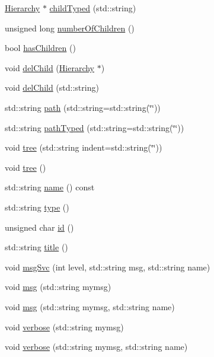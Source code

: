 \begin{DoxyCompactItemize}
\hyperlink{classHierarchy}{Hierarchy} $\ast$ \hyperlink{classHierarchy_a0c15a5276a3b80b4354d6bd8a01e0708}{childTyped} (std::string)
\item 
unsigned long \hyperlink{classHierarchy_ab16e84de65fd84e14001a6cf941c8be4}{numberOfChildren} ()
\item 
bool \hyperlink{classHierarchy_a255174fe4d316d2a3f430dcb9dab29f1}{hasChildren} ()
\item 
void \hyperlink{classHierarchy_a2b2b359fac003233f65786a616766bde}{delChild} (\hyperlink{classHierarchy}{Hierarchy} $\ast$)
\item 
void \hyperlink{classHierarchy_a1928ac7615fe0b5e55cd707f70dc6781}{delChild} (std::string)
\item 
std::string \hyperlink{classHierarchy_aa7990fa7caf132d83e361ce033c6c65a}{path} (std::string=std::string(\char`\"{}\char`\"{}))
\item 
std::string \hyperlink{classHierarchy_a1efd56cd164d328d2002e53a10a19b8c}{pathTyped} (std::string=std::string(\char`\"{}\char`\"{}))
\item 
void \hyperlink{classHierarchy_a76e914b9a677a22a82deb74d892bf261}{tree} (std::string indent=std::string(\char`\"{}\char`\"{}))
\item 
void \hyperlink{classHierarchy_a594c294c5f60c230e106d522ed008212}{tree} ()
\item 
std::string \hyperlink{classObject_a975e888d50bfcbffda2c86368332a5cd}{name} () const 
\item 
std::string \hyperlink{classObject_a84f99f70f144a83e1582d1d0f84e4e62}{type} ()
\item 
unsigned char \hyperlink{classObject_af99145335cc61ff6e2798ea17db009d2}{id} ()
\item 
std::string \hyperlink{classObject_a73a0f1a41828fdd8303dd662446fb6c3}{title} ()
\item 
void \hyperlink{classObject_a3f9d5537ebce0c0f2bf6ae4d92426f3c}{msgSvc} (int level, std::string msg, std::string name)
\item 
void \hyperlink{classObject_a58b2d0618c2d08cf2383012611528d97}{msg} (std::string mymsg)
\item 
void \hyperlink{classObject_ac5d59299273cee27aacf7de00d2e7034}{msg} (std::string mymsg, std::string name)
\item 
void \hyperlink{classObject_a83d2db2df682907ea1115ad721c1c4a1}{verbose} (std::string mymsg)
\item 
void \hyperlink{classObject_a2d4120195317e2a3c6532e8bb9f3da68}{verbose} (std::string mymsg, std::string name)

\end{DoxyCompactItemize}
